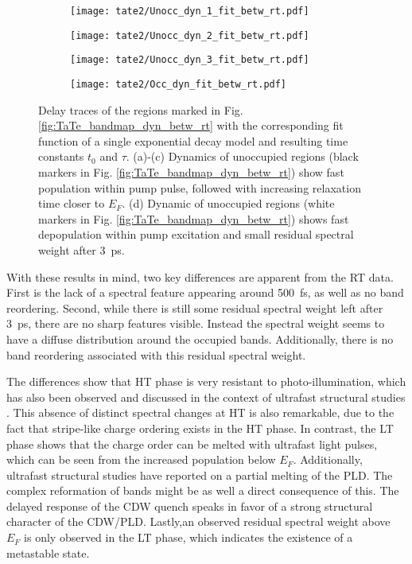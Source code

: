 \begin{figure}[b!]
	\centering
	\begin{subfigure}[b]{0.24\textwidth}
		\texttt{[image: tate2/Unocc\_dyn\_1\_fit\_betw\_rt.pdf]}
		\caption{}
	\end{subfigure}
	\begin{subfigure}[b]{0.24\textwidth}
		\texttt{[image: tate2/Unocc\_dyn\_2\_fit\_betw\_rt.pdf]}
		\caption{}
	\end{subfigure}
	\begin{subfigure}[b]{0.24\textwidth}
		\texttt{[image: tate2/Unocc\_dyn\_3\_fit\_betw\_rt.pdf]}
		\caption{}
	\end{subfigure}
	\begin{subfigure}[b]{0.24\textwidth}
		\texttt{[image: tate2/Occ\_dyn\_fit\_betw\_rt.pdf]}
		\caption{}
	\end{subfigure}
	\caption{
		Delay traces of the regions marked in Fig. \ref{fig:TaTe_bandmap_dyn_betw_rt} with the corresponding fit function of a single exponential decay model and resulting time constants $t_0$ and $\tau$. (a)-(c) Dynamics of unoccupied regions (black markers in Fig. \ref{fig:TaTe_bandmap_dyn_betw_rt}) show fast population within pump pulse, followed with increasing relaxation time closer to $E_F$. (d) Dynamic of unoccupied regions (white markers in Fig. \ref{fig:TaTe_bandmap_dyn_betw_rt}) shows fast depopulation within pump excitation and small residual spectral weight after \qty{3}{\pico\second}.}
	\label{fig:TaTe_dyn_betw_rt}
\end{figure}

With these results in mind, two key differences are apparent from the RT data.
First is the lack of a spectral feature appearing around \qty{500}{\femto\second}, as well as no band reordering.
Second, while there is still some residual spectral weight left after \qty{3}{\pico\second}, there are no sharp features visible.
Instead the spectral weight seems to have a diffuse distribution around the occupied bands.
Additionally, there is no band reordering associated with this residual spectral weight.

The differences show that HT phase is very resistant to photo-illumination, which has also been observed and discussed in the context of ultrafast structural studies \cite{domrose_femtosecond_2024}.
This absence of distinct spectral changes at HT is also remarkable, due to the fact that stripe-like charge ordering exists in the HT phase.
In contrast, the LT phase shows that the charge order can be melted with ultrafast light pulses, which can be seen from the increased population below $E_F$.
Additionally, ultrafast structural studies \cite{domrose_femtosecond_2024, siddiqui_ultrafast_2021} have reported on a partial melting of the PLD.
The complex reformation of bands might be as well a direct consequence of this.
The delayed response of the CDW quench speaks in favor of a strong structural character of the CDW/PLD.
Lastly,an observed residual spectral weight above $E_F$ is only observed in the LT phase, which indicates the existence of a metastable state.

